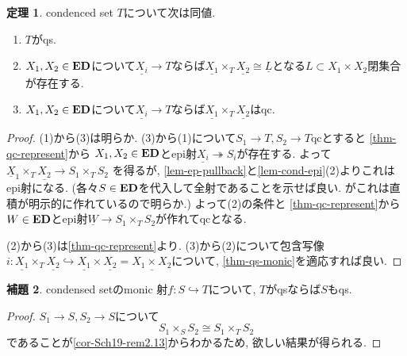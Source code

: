 \documentclass[dvipdfmx,a4paper,11pt]{article}
\theoremstyle{definition}
\newtheorem{thm}{定理}
\newtheorem{lem}[thm]{補題}
\begin{document}
 \begin{tcolorbox}
 [colback = white, colframe = green!35!black, fonttitle = \bfseries,breakable = true]
 \begin{thm}\cite[Proposition 4.11.12]{Bar22}
 \label{thm-qs}
condenced set $T$について次は同値.
\begin{enumerate}
\item $T$がqs.
\item $X_1, X_2 \in {\bf ED}$について$\underline{X_i} \to T$ならば$\underline{X_1}  \times_{T}\underline{X_2} \cong \underline{L}$となる$L \subset X_1 \times X_2$閉集合が存在する. 
\item $X_1, X_2 \in {\bf ED}$について$\underline{X_i} \to T$ならば$\underline{X_1}  \times_{T}\underline{X_2} $はqc.
\end{enumerate}
 \end{thm}
 \end{tcolorbox}
 \begin{proof}
 (1)から(3)は明らか.
 (3)から(1)について$S_1 \to T, S_2 \to T$qcとすると
 \ref{thm-qc-represent}から
 $X_1, X_2 \in {\bf ED}$とepi射$\underline{X_i} \twoheadrightarrow S_i$が存在する.
 よって$\underline{X}_1 \times_{T} \underline{X_2} \to S_1 \times_{T} S_2$
 を得るが, \ref{lem-ep-pullback}と\ref{lem-cond-epi}(2)よりこれはepi射になる.
 (各々$S \in {\bf ED}$を代入して全射であることを示せば良い. がこれは直積が明示的に作れているので明らか.)
 よって(2)の条件と \ref{thm-qc-represent}から $W\in {\bf ED}$とepi射$\underline{W} \to S_1 \times_{T} S_2$が作れてqcとなる. 
 
 (2)から(3)は\ref{thm-qc-represent}より.
 (3)から(2)について包含写像$i : \underline{X_1}  \times_{T}\underline{X_2} \hookrightarrow \underline{X_1} \times \underline{X_2} = \underline{X_1 \times X_2}$について, \ref{thm-qs-monic}を適応すれば良い. 
 \end{proof}

  \begin{tcolorbox}
 [colback = white, colframe = green!35!black, fonttitle = \bfseries,breakable = true]
\begin{lem}
\label{lem-qs-sub}
condensed setのmonic 射$f : S \hookrightarrow T$について, $T$がqsならば$S$もqs.
\end{lem}
\end{tcolorbox}
\begin{proof}
$S_1 \to S, S_2 \to S$について
$$
S_1 \times_S S_2 \cong S_1 \times_T S_2
$$
であることが\ref{cor-Sch19-rem2.13}からわかるため, 欲しい結果が得られる. 
\end{proof}
\end{document}
